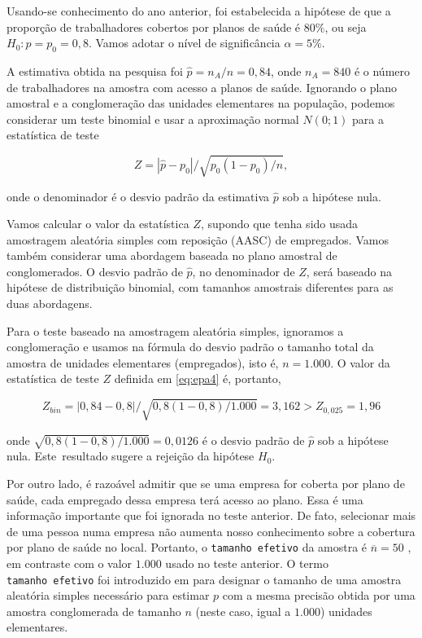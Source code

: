 \documentclass[]{book}
\theoremstyle{definition}
\theoremstyle{definition}
\theoremstyle{definition}
\theoremstyle{remark}
\begin{document}
Usando-se conhecimento do ano anterior, foi estabelecida a hipótese de
que a proporção de trabalhadores cobertos por planos de saúde é
\(80\%\), ou seja \(H_{0}:p=p_{0}=0,8\). Vamos adotar o nível de
significância \(\alpha =5\%\).

A estimativa obtida na pesquisa foi \(\widehat{p}=n_{A}/n=0,84\), onde
\(n_{A}=840\) é o número de trabalhadores na amostra com acesso a planos
de saúde. Ignorando o plano amostral e a conglomeração das unidades
elementares na população, podemos considerar um teste binomial e usar a
aproximação normal \(N(0;1)\) para a estatística de teste

\begin{equation}
Z=|\widehat{p}-p_{0}|/\sqrt{p_{0}\left( 1-p_{0}\right) /n},  \label{eq:epa4}
\end{equation}

onde o denominador é o desvio padrão da estimativa \(\widehat{p}\) sob a
hipótese nula.

Vamos calcular o valor da estatística \(Z\), supondo que tenha sido
usada amostragem aleatória simples com reposição (AASC) de empregados.
Vamos também considerar uma abordagem baseada no plano amostral de
conglomerados. O desvio padrão de \(\widehat{p}\), no denominador de
\(Z\), será baseado na hipótese de distribuição binomial, com tamanhos
amostrais diferentes para as duas abordagens.

Para o teste baseado na amostragem aleatória simples, ignoramos a
conglomeração e usamos na fórmula do desvio padrão o tamanho total da
amostra de unidades elementares (empregados), isto é, \(n=1.000\). O
valor da estatística de teste \(Z\) definida em \eqref{eq:epa4} é,
portanto,

\begin{equation}
Z_{bin}=|0,84-0,8|/\sqrt{0,8\left( 1-0,8\right) /1.000}=3,162>Z_{0,025}=1,96
\label{eq:epa5}
\end{equation}

onde \(\sqrt{0,8\left( 1-0,8\right) /1.000}=0,0126\) é o desvio padrão
de \(\widehat{p}\) sob a hipótese nula. Este~resultado sugere a rejeição
da hipótese \(H_{0}\).

Por outro lado, é razoável admitir que se uma empresa for coberta por
plano de saúde, cada empregado dessa empresa terá acesso ao plano. Essa
é uma informação importante que foi ignorada no teste anterior. De fato,
selecionar mais de uma pessoa numa empresa não aumenta nosso
conhecimento sobre a cobertura por plano de saúde no local. Portanto, o
\texttt{tamanho\ efetivo} da amostra é \(\overline{n}=50\) , em
contraste com o valor \(1.000\) usado no teste anterior. O termo
\texttt{tamanho\ efetivo} foi introduzido em \citep{Kish65} para
designar o tamanho de uma amostra aleatória simples necessário para
estimar \(p\) com a mesma precisão obtida por uma amostra conglomerada
de tamanho \(n\) (neste caso, igual a \(1.000\)) unidades elementares.
\end{document}
